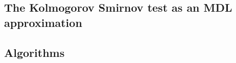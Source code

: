 \documentclass[11pt]{article}
\begin{document}
\subsection{The Kolmogorov Smirnov test as an MDL approximation}

\subsection{Algorithms}



\end{document}
